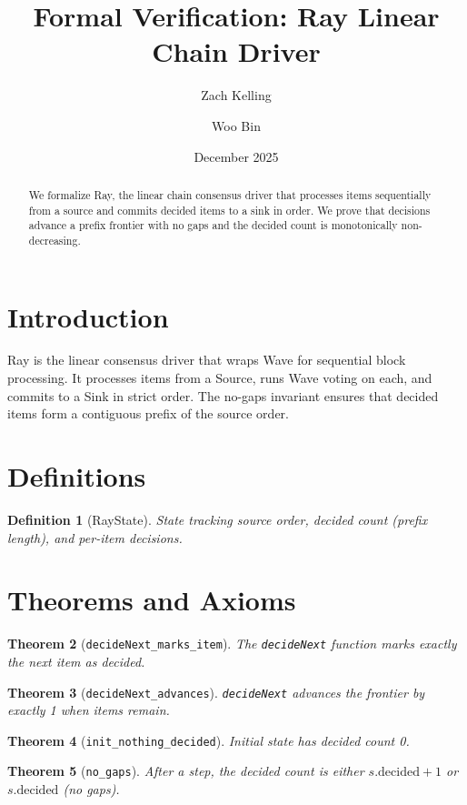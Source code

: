 \documentclass[11pt]{article}
\title{Formal Verification: Ray Linear Chain Driver}
\author{Zach Kelling \and Woo Bin}
\date{December 2025}
\newtheorem{theorem}{Theorem}
\newtheorem{definition}[theorem]{Definition}
\begin{document}
\maketitle

\begin{abstract}
We formalize Ray, the linear chain consensus driver that processes items sequentially from a source and commits decided items to a sink in order. We prove that decisions advance a prefix frontier with no gaps and the decided count is monotonically non-decreasing.
\end{abstract}

\section{Introduction}
Ray is the linear consensus driver that wraps Wave for sequential block processing. It processes items from a Source, runs Wave voting on each, and commits to a Sink in strict order. The no-gaps invariant ensures that decided items form a contiguous prefix of the source order.

\section{Definitions}
\begin{definition}[RayState]
State tracking source order, decided count (prefix length), and per-item decisions.
\end{definition}


\section{Theorems and Axioms}
\begin{theorem}[\texttt{decideNext\_marks\_item}]
The \texttt{decideNext} function marks exactly the next item as decided.
\end{theorem}

\begin{theorem}[\texttt{decideNext\_advances}]
\texttt{decideNext} advances the frontier by exactly 1 when items remain.
\end{theorem}

\begin{theorem}[\texttt{init\_nothing\_decided}]
Initial state has decided count 0.
\end{theorem}

\begin{theorem}[\texttt{no\_gaps}]
After a step, the decided count is either $s.\text{decided}+1$ or $s.\text{decided}$ (no gaps).
\end{theorem}
\end{document}
